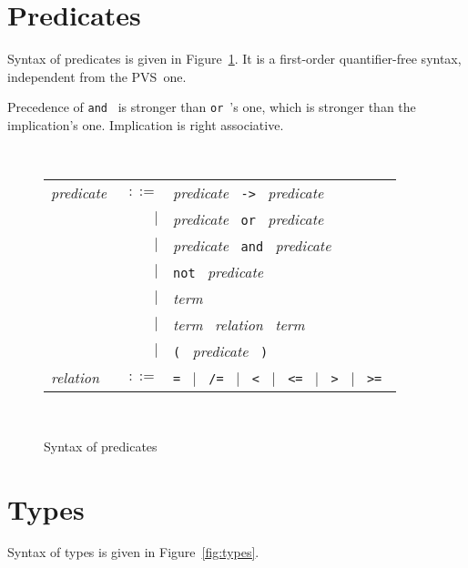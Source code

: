 \documentclass[a4paper,12pt]{report}
\newcommand{\pvs}{\textsf{PVS}}
\newcommand{\te}[1]{\texttt{#1}~}
\newcommand{\nt}[1]{\textsl{#1}~}
\begin{document}
\section{Predicates}

Syntax of predicates is given in Figure~\ref{fig:predicates}.
It is a first-order quantifier-free syntax, independent from the \pvs\ one.

Precedence of \te{and} is stronger than \te{or}'s one, which is
stronger than the implication's one. Implication is right associative.

\begin{figure}[htbp]
\begin{center}
\hrulefill\\
\begin{tabular}{lrl}
  \nt{predicate}
    & $::=$ & \nt{predicate} \te{->} \nt{predicate} \\
      & $|$ & \nt{predicate} \te{or} \nt{predicate} \\
      & $|$ & \nt{predicate} \te{and} \nt{predicate} \\
      & $|$ & \te{not} \nt{predicate} \\
      & $|$ & \nt{term} \\
      & $|$ & \nt{term} \nt{relation} \nt{term} \\
      & $|$ & \te{(} \nt{predicate} \te{)}
  \\[0.1em]

  \nt{relation}
    & $::=$ & \te{=} $|$~ \te{/=} $|$~ 
              \te{<} $|$~ \te{<=} $|$~ \te{>} $|$~ \te{>=}
\end{tabular}\\
\hrulefill
\caption{Syntax of predicates}
\label{fig:predicates}
\end{center}            
\end{figure}

\section{Types}

Syntax of types is given in Figure~\ref{fig:types}.
\end{document}
